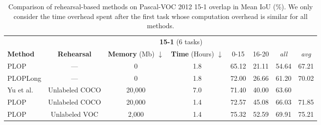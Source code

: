 \begin{table*}[t]
    \centering
    \caption{Comparison of rehearsal-based methods on Pascal-VOC 2012 15-1 overlap in Mean IoU (\%). We only consider the time overhead spent after the first task whose computation overhead is similar for all methods.}
    \vspace*{-0.3cm}
    \label{tab:voc_rehearsal_learning}
    \begin{tabular}{@{}l|ccc|cccc@{}}
        \toprule
                                                                & \multicolumn{7}{c}{\textbf{15-1} (6 tasks)}                                                                                                                                              \\
        \textbf{Method}                                         & \textbf{Rehearsal}                          & \textbf{Memory} (Mb) $\downarrow$ & \textbf{Time} (Hours) $\downarrow$ & 0-15           & 16-20          & \textit{all}   & \textit{avg}   \\
        \midrule
        PLOP                                                    & ---                                         & 0                                 & 1.8                                & 65.12          & 21.11          & 54.64          & 67.21          \\
        PLOPLong                                                & ---                                         & 0                                 & 1.8                                & 72.00          & 26.66          & 61.20          & 70.02          \\
        \hdashline
        Yu et al.\cite{yu2020continualsegmentationselftraining} & Unlabeled COCO                              & 20,000                            & 7.0                                & 71.40          & 40.00          & 63.60          &                \\
        PLOP                                                    & Unlabeled COCO                              & 20,000                            & 1.4                                & 72.57          & 45.08          & 66.03          & 71.85          \\
        PLOP                                                    & Unlabeled VOC                               & 2,000                             & 1.4                                & 75.32          & 52.59          & 69.91          & 75.21          \\

\end{tabular}
\end{table*}
